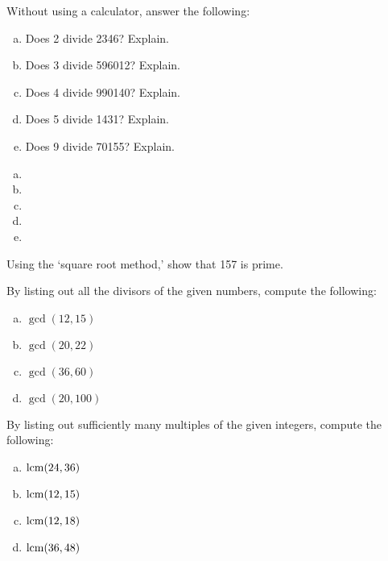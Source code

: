 \documentclass[11pt,letterpaper]{article}
\begin{document}
\newpage



 Without using a calculator, answer the following:
	\begin{enumerate}[(a)]
	\item Does 2 divide 2346? Explain.
	\item Does 3 divide 596012? Explain.
	\item Does 4 divide 990140? Explain.
	\item Does 5 divide 1431? Explain.
	\item Does 9 divide 70155? Explain. 
	\end{enumerate} \pspace

\sol
\begin{enumerate}[(a)]
\item 
\item 
\item 
\item 
\item 
\end{enumerate}



\newpage



 Using the `square root method,' show that 157 is prime. 



\newpage



 By listing out all the divisors of the given numbers, compute the following:
	\begin{enumerate}[(a)]
	\item $\gcd(12, 15)$
	\item $\gcd(20, 22)$
	\item $\gcd(36, 60)$
	\item $\gcd(20, 100)$
	\end{enumerate}



\newpage



 By listing out sufficiently many multiples of the given integers, compute the following:
	\begin{enumerate}[(a)]
	\item $\operatorname{lcm}(24, 36)$
	\item $\operatorname{lcm}(12, 15)$
	\item $\operatorname{lcm}(12, 18)$
	\item $\operatorname{lcm}(36, 48)$
	\end{enumerate}
\end{document}
